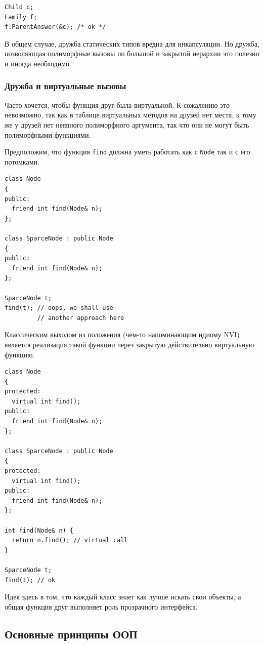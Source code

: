 \documentclass[a4paper,12pt,oneside]{article}
\begin{document}
\begin{lstlisting}
Child c;
Family f;
f.ParentAnswer(&c); /* ok */
\end{lstlisting}

В общем случае, дружба статических типов вредна для инкапсуляции. Но дружба, позволяющая полиморфные вызовы по большой и закрытой иерархии это полезно и иногда необходимо. 

\subsubsection{Дружба и виртуальные вызовы}

Часто хочется, чтобы функция-друг была виртуальной. К сожалению это невозможно, так как в таблице виртуальных методов на друзей нет места, к тому же у друзей нет неявного полиморфного аргумента, так что они не могут быть полиморфными функциями.

Предположим, что функция \lstinline!find! должна уметь работать как с \lstinline!Node! так и с его потомками.

\begin{lstlisting}
class Node
{
public:
  friend int find(Node& n);
};

class SparceNode : public Node
{
public:
  friend int find(Node& n);
};

SparceNode t;
find(t); // oops, we shall use 
         // another approach here
\end{lstlisting}

Классическим выходом из положения (чем-то напоминающим идиому NVI) является реализация такой функции через закрытую действительно виртуальную функцию.

\begin{lstlisting}
class Node
{
protected:
  virtual int find();
public:
  friend int find(Node& n);
};

class SparceNode : public Node
{
protected:
  virtual int find();
public:
  friend int find(Node& n);
};

int find(Node& n) {
  return n.find(); // virtual call
}

SparceNode t;
find(t); // ok
\end{lstlisting}

Идея здесь в том, что каждый класс знает как лучше искать свои объекты, а общая функция друг выполняет роль прозрачного интерфейса.

\pagebreak
\subsection{Основные принципы ООП}\label{SOLID}
\end{document}
